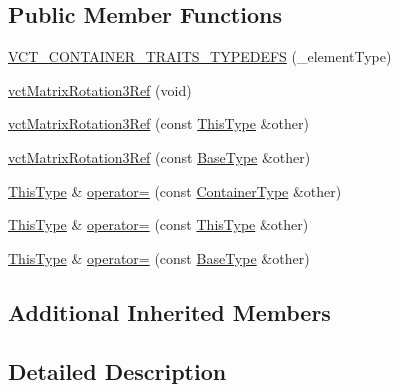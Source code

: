 \subsection*{Public Member Functions}
\begin{DoxyCompactItemize}
\item 
\hyperlink{classvct_matrix_rotation3_ref_a652fd3b2ea31f9fc7d6782e796a087d8}{V\+C\+T\+\_\+\+C\+O\+N\+T\+A\+I\+N\+E\+R\+\_\+\+T\+R\+A\+I\+T\+S\+\_\+\+T\+Y\+P\+E\+D\+E\+F\+S} (\+\_\+element\+Type)
\item 
\hyperlink{classvct_matrix_rotation3_ref_a1a6432e931dbde0cafd5be068e4e239d}{vct\+Matrix\+Rotation3\+Ref} (void)
\item 
\hyperlink{classvct_matrix_rotation3_ref_a2cfe979deadb9e4f6deee885c1a27265}{vct\+Matrix\+Rotation3\+Ref} (const \hyperlink{classvct_matrix_rotation3_ref_aa4f99a97ebf5b94d4030335f45c91966}{This\+Type} \&other)
\item 
\hyperlink{classvct_matrix_rotation3_ref_ac8e3b31ae23fb9279e78aa52b978e696}{vct\+Matrix\+Rotation3\+Ref} (const \hyperlink{classvct_matrix_rotation3_ref_a6710fec4e5d3c1a4f8f376293b1f30dd}{Base\+Type} \&other)
\item 
\hyperlink{classvct_matrix_rotation3_ref_aa4f99a97ebf5b94d4030335f45c91966}{This\+Type} \& \hyperlink{classvct_matrix_rotation3_ref_a005130428ee9ad279f96ecfd0c2036f3}{operator=} (const \hyperlink{classvct_matrix_rotation3_ref_acf072a6c67950bf0621787114bb016b4}{Container\+Type} \&other)
\item 
\hyperlink{classvct_matrix_rotation3_ref_aa4f99a97ebf5b94d4030335f45c91966}{This\+Type} \& \hyperlink{classvct_matrix_rotation3_ref_ad1b0080ea17d77a4376175ceb4afa5ba}{operator=} (const \hyperlink{classvct_matrix_rotation3_ref_aa4f99a97ebf5b94d4030335f45c91966}{This\+Type} \&other)
\item 
\hyperlink{classvct_matrix_rotation3_ref_aa4f99a97ebf5b94d4030335f45c91966}{This\+Type} \& \hyperlink{classvct_matrix_rotation3_ref_a50dc3884fb1294cc92212917c28b9c02}{operator=} (const \hyperlink{classvct_matrix_rotation3_ref_a6710fec4e5d3c1a4f8f376293b1f30dd}{Base\+Type} \&other)
\end{DoxyCompactItemize}
\subsection*{Additional Inherited Members}


\subsection{Detailed Description}
